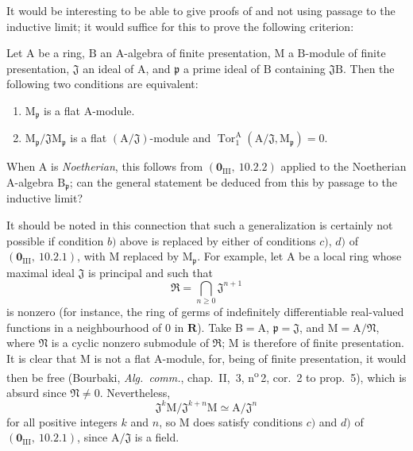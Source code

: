 \begin{remark}[11.3.12]
\label{IV.11.3.12}
It would be interesting to be able to give proofs of  and  not using passage to the inductive limit; it would suffice for this to prove the following criterion:

Let $\mathrm{A}$ be a ring, $\mathrm{B}$ an $\mathrm{A}$-algebra of finite presentation, $\mathrm{M}$ a $\mathrm{B}$-module of finite presentation, $\mathfrak{J}$ an  ideal of $\mathrm{A}$, and $\mathfrak{p}$ a prime ideal of $\mathrm{B}$ containing $\mathfrak{J}\mathrm{B}$. Then the following two conditions are equivalent:
\begin{enumerate}[label=\emph{\alph*)}]
  \item $\mathrm{M}_\mathfrak{p}$ is a flat $\mathrm{A}$-module.
  \item $\mathrm{M}_\mathfrak{p}/\mathfrak{J}\mathrm{M}_\mathfrak{p}$ is a flat $(\mathrm{A}/\mathfrak{J})$-module and $\operatorname{Tor}_1^\mathrm{A}(\mathrm{A}/\mathfrak{J},\mathrm{M}_\mathfrak{p})=0$.
\end{enumerate}
When $\mathrm{A}$ is \emph{Noetherian}, this follows from $(\mathbf{0}_{\mathrm{III}},~10.2.2)$ applied to the Noetherian $\mathrm{A}$-algebra $\mathrm{B}_\mathfrak{p}$; can the general statement be deduced from this by passage to the inductive limit?

It should be noted in this connection that such a generalization is certainly not possible if condition $b)$ above is replaced by either of conditions $c)$, $d)$ of $(\mathbf{0}_{\mathrm{III}},~10.2.1)$, with $\mathrm{M}$ replaced by $\mathrm{M}_\mathfrak{p}$. For example, let $\mathrm{A}$ be a local ring whose maximal ideal $\mathfrak{J}$ is principal and such that
\[
  \mathfrak{R}=\bigcap_{n\geqslant 0}\mathfrak{J}^{n+1}
\]
is nonzero (for instance, the ring of germs of indefinitely differentiable real-valued functions in a neighbourhood of $0$ in $\mathbf{R}$). Take $\mathrm{B}=\mathrm{A}$, $\mathfrak{p}=\mathfrak{J}$, and $\mathrm{M}=\mathrm{A}/\mathfrak{N}$, where $\mathfrak{N}$ is a cyclic nonzero submodule of $\mathfrak{R}$; $\mathrm{M}$ is therefore of finite presentation. It is clear that $\mathrm{M}$ is not a flat $\mathrm{A}$-module, for, being of finite presentation, it would then be free (Bourbaki, \emph{Alg.\ comm.}, chap.~II, \textsection\,3, n\textsuperscript{o}\,2, cor.~2 to prop.~5), which is absurd since $\mathfrak{N}\neq 0$. Nevertheless,
\[
  \mathfrak{J}^k\mathrm{M}/\mathfrak{J}^{k+n}\mathrm{M}\simeq \mathrm{A}/\mathfrak{J}^n
\]
for all positive integers $k$ and $n$, so $\mathrm{M}$ does satisfy conditions $c)$ and $d)$ of $(\mathbf{0}_{\mathrm{III}},~10.2.1)$, since $\mathrm{A}/\mathfrak{J}$ is a field.
\end{remark}

